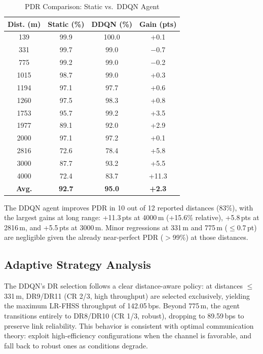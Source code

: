 \documentclass[conference]{IEEEtran}
\begin{document}
	\begin{table}[!t]
		\centering
		\caption{PDR Comparison: Static vs.\ DDQN Agent}
		\label{tab:pdr}
		\begin{tabular}{|c|c|c|c|}
			\hline
			\textbf{Dist. (m)} & \textbf{Static (\%)} & \textbf{DDQN (\%)} & \textbf{Gain (pts)} \\
			\hline
			139   & 99.9 & 100.0 & +0.1 \\
			331   & 99.7 & 99.0  & \cellcolor{red!20}$-$0.7 \\
			775   & 99.2 & 99.0  & \cellcolor{red!20}$-$0.2 \\
			1015  & 98.7 & 99.0  & +0.3 \\
			1194  & 97.1 & 97.7  & +0.6 \\
			1260  & 97.5 & 98.3  & +0.8 \\
			1753  & 95.7 & 99.2  & +3.5 \\
			1977  & 89.1 & 92.0  & +2.9 \\
			2000  & 97.1 & 97.2  & +0.1 \\
			2816  & 72.6 & 78.4  & +5.8 \\
			3000  & 87.7 & 93.2  & +5.5 \\
			4000  & 72.4 & 83.7  & \cellcolor{green!20}+11.3 \\
			\hline
			\textbf{Avg.} & \textbf{92.7} & \textbf{95.0} & \cellcolor{green!20}\textbf{+2.3} \\
			\hline
		\end{tabular}
	\end{table}
	
	The DDQN agent improves PDR in 10 out of 12 reported distances (83\%),
	with the largest gains at long range: +11.3\,pts at 4000\,m (+15.6\%
	relative), +5.8\,pts at 2816\,m, and +5.5\,pts at 3000\,m. Minor
	regressions at 331\,m and 775\,m ($\leq$0.7\,pt) are negligible given
	the already near-perfect PDR ($>$99\%) at those distances.
	
	\subsection{Adaptive Strategy Analysis}
	
	The DDQN's DR selection follows a clear distance-aware policy:
	at distances $\leq$331\,m, DR9/DR11 (CR 2/3, high throughput) are selected
	exclusively, yielding the maximum LR-FHSS throughput of 142.05\,bps. Beyond
	775\,m, the agent transitions entirely to DR8/DR10 (CR 1/3, robust), dropping
	to 89.59\,bps to preserve link reliability. This behavior is consistent with
	optimal communication theory: exploit high-efficiency configurations when the
	channel is favorable, and fall back to robust ones as conditions degrade.
	
\end{document}
